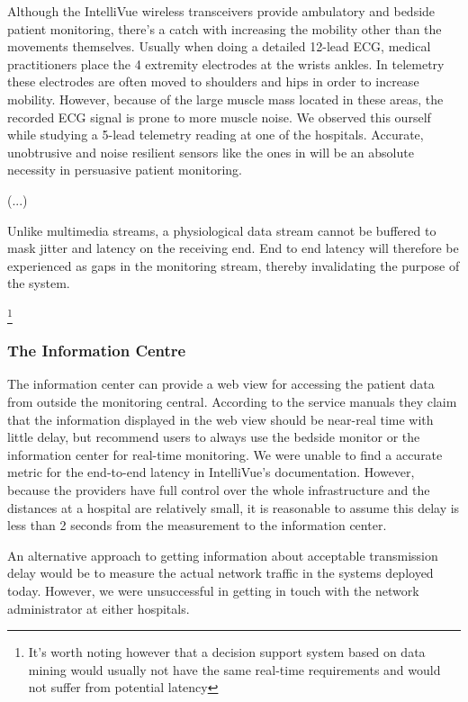 Although the IntelliVue wireless transceivers provide ambulatory and bedside patient monitoring, there's a catch with increasing the mobility other than the movements themselves. Usually when doing a detailed 12-lead ECG, medical practitioners place the 4 extremity electrodes at the wrists ankles. In telemetry these electrodes are often moved to shoulders and hips in order to increase mobility. However, because of the large muscle mass located in these areas, the recorded ECG signal is prone to more muscle noise. We observed this ourself while studying a 5-lead telemetry reading at one of the hospitals. Accurate, unobtrusive and noise resilient sensors like the ones in \cite{ChulsungPark:2006tf, Anonymous:FtVb5yQr} will be an absolute necessity in persuasive patient monitoring. 

\cite{}
(...)

Unlike multimedia streams, a physiological data stream cannot be buffered to mask jitter and latency on the receiving end. End to end latency will therefore be experienced as gaps in the monitoring stream, thereby invalidating the purpose of the system.


\footnote{It's worth noting however that a decision support system based on data mining would usually not have the same real-time requirements and would not suffer from potential latency}


\subsubsection{The Information Centre} %
\label{ssub:the_information_centre}

The information center can provide a web view for accessing the patient data from outside the monitoring central. According to the service manuals they claim that the information displayed in the web view should be near-real time with little delay, but recommend users to always use the bedside monitor or the information center for real-time monitoring. We were unable to find a accurate metric for the end-to-end latency in IntelliVue's documentation. However, because the providers have full control over the whole infrastructure and the distances at a hospital are relatively small, it is reasonable to assume this delay is less than 2 seconds from the measurement to the information center.

An alternative approach to getting information about acceptable transmission delay would be to measure the actual network traffic in the systems deployed today. However, we were unsuccessful in getting in touch with the network administrator at either hospitals.

